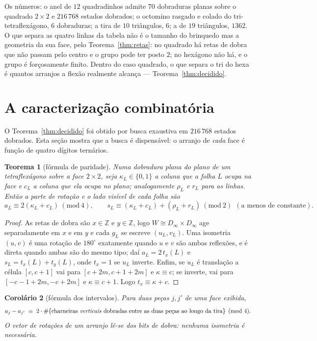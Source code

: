 \documentclass[11pt,a4paper]{article}
\theoremstyle{plain}
\newtheorem{teorema}{Teorema}[section]
\newtheorem{corolario}[teorema]{Corolário}
\theoremstyle{definition}
\theoremstyle{remark}
\newcommand{\Z}{\mathbb{Z}}
\begin{document}
Os números: o anel de $12$ quadradinhos admite $70$ dobraduras planas sobre o
quadrado $2\times2$ e $216\,768$ estados dobrados; o octomino rasgado e colado
do tri-tetraflexágono, $6$ dobraduras; a tira de $10$ triângulos, $6$; a de
$19$ triângulos, $1362$. O que separa as quatro linhas da tabela não é o
tamanho do brinquedo mas a geometria da sua face, pelo
Teorema~\ref{thm:retas}: no quadrado há retas de dobra que não passam pelo
centro e o grupo pode ter posto $2$; no hexágono não há, e o grupo é
forçosamente finito. Dentro do caso quadrado, o que separa o tri do hexa é
quantos arranjos a flexão realmente alcança --- Teorema~\ref{thm:decidido}.


\section{A caracterização combinatória}\label{sec:paridade}

O Teorema~\ref{thm:decidido} foi obtido por busca exaustiva em $216\,768$
estados dobrados. Esta seção mostra que a busca é dispensável: o arranjo de
\emph{cada} face é função de quatro dígitos ternários.

\begin{teorema}[fórmula de paridade]\label{thm:paridade}
Numa dobradura plana do plano de um tetraflexágono sobre a face $2\times2$,
seja $\kappa_L\in\{0,1\}$ a coluna que a folha $L$ ocupa na face e $c_L$ a
coluna que ela ocupa no plano; analogamente $\rho_L$ e $r_L$ para as linhas.
Então a parte de rotação e o lado visível de cada folha são
\[
a_L\equiv 2(\kappa_L+c_L)\ (\mathrm{mod}\ 4),\qquad
s_L\equiv(\kappa_L+c_L)+(\rho_L+r_L)\ (\mathrm{mod}\ 2)\ \ (\text{a menos de constante}).
\]
\end{teorema}

\begin{proof}
As retas de dobra são $x\in\Z$ e $y\in\Z$, logo $W\cong D_\infty\times D_\infty$
age separadamente em $x$ e em $y$ e cada $g_L$ se escreve $(u_L,v_L)$. Uma
isometria $(u,v)$ é uma rotação de $180^\circ$ exatamente quando $u$ e $v$ são
ambas reflexões, e é direta quando ambas são do mesmo tipo; daí
$a_L=2\,t_x(L)$ e $s_L=t_x(L)+t_y(L)$, onde $t_x=1$ se $u_L$ inverte. Enfim,
se $u_L$ é translação a célula $[c,c+1]$ vai para $[c+2m,c+1+2m]$ e
$\kappa\equiv c$; se inverte, vai para $[-c-1+2m,-c+2m]$ e
$\kappa\equiv c+1$. Logo $t_x\equiv\kappa+c$.
\end{proof}

\begin{corolario}[fórmula dos intervalos]\label{cor:intervalos}
Para duas peças $j,j'$ de uma face exibida,
\[
a_j-a_{j'}\;\equiv\;2\cdot\#\{\text{charneiras \emph{verticais} dobradas entre
as duas peças ao longo da tira}\}\pmod 4 .
\]
O vetor de rotações de um arranjo lê-se dos bits de dobra: nenhuma isometria é
necessária.
\end{corolario}
\end{document}
